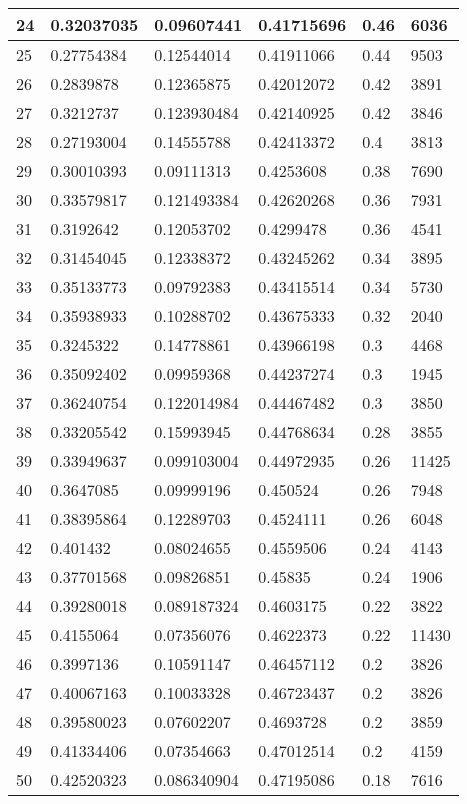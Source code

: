 \begin{longtable}{|l|l|l|l|l|l|}
24 & 0.32037035 & 0.09607441 & 0.41715696 & 0.46 & 6036 \\ \hline 
25 & 0.27754384 & 0.12544014 & 0.41911066 & 0.44 & 9503 \\ \hline 
26 & 0.2839878 & 0.12365875 & 0.42012072 & 0.42 & 3891 \\ \hline 
27 & 0.3212737 & 0.123930484 & 0.42140925 & 0.42 & 3846 \\ \hline 
28 & 0.27193004 & 0.14555788 & 0.42413372 & 0.4 & 3813 \\ \hline 
29 & 0.30010393 & 0.09111313 & 0.4253608 & 0.38 & 7690 \\ \hline 
30 & 0.33579817 & 0.121493384 & 0.42620268 & 0.36 & 7931 \\ \hline 
31 & 0.3192642 & 0.12053702 & 0.4299478 & 0.36 & 4541 \\ \hline 
32 & 0.31454045 & 0.12338372 & 0.43245262 & 0.34 & 3895 \\ \hline 
33 & 0.35133773 & 0.09792383 & 0.43415514 & 0.34 & 5730 \\ \hline 
34 & 0.35938933 & 0.10288702 & 0.43675333 & 0.32 & 2040 \\ \hline 
35 & 0.3245322 & 0.14778861 & 0.43966198 & 0.3 & 4468 \\ \hline 
36 & 0.35092402 & 0.09959368 & 0.44237274 & 0.3 & 1945 \\ \hline 
37 & 0.36240754 & 0.122014984 & 0.44467482 & 0.3 & 3850 \\ \hline 
38 & 0.33205542 & 0.15993945 & 0.44768634 & 0.28 & 3855 \\ \hline 
39 & 0.33949637 & 0.099103004 & 0.44972935 & 0.26 & 11425 \\ \hline 
40 & 0.3647085 & 0.09999196 & 0.450524 & 0.26 & 7948 \\ \hline 
41 & 0.38395864 & 0.12289703 & 0.4524111 & 0.26 & 6048 \\ \hline 
42 & 0.401432 & 0.08024655 & 0.4559506 & 0.24 & 4143 \\ \hline 
43 & 0.37701568 & 0.09826851 & 0.45835 & 0.24 & 1906 \\ \hline 
44 & 0.39280018 & 0.089187324 & 0.4603175 & 0.22 & 3822 \\ \hline 
45 & 0.4155064 & 0.07356076 & 0.4622373 & 0.22 & 11430 \\ \hline 
46 & 0.3997136 & 0.10591147 & 0.46457112 & 0.2 & 3826 \\ \hline 
47 & 0.40067163 & 0.10033328 & 0.46723437 & 0.2 & 3826 \\ \hline 
48 & 0.39580023 & 0.07602207 & 0.4693728 & 0.2 & 3859 \\ \hline 
49 & 0.41334406 & 0.07354663 & 0.47012514 & 0.2 & 4159 \\ \hline 
50 & 0.42520323 & 0.086340904 & 0.47195086 & 0.18 & 7616 \\ \hline 
\end{longtable}